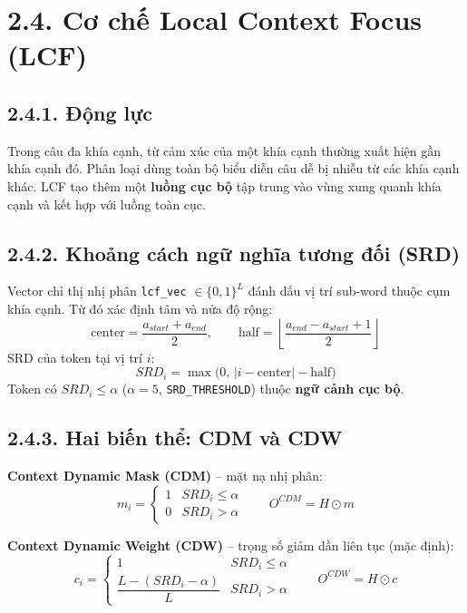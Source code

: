 \section{2.4.\; Cơ chế Local Context Focus (LCF)}
\label{sec:lcf}

\subsection{2.4.1.\; Động lực}

Trong câu đa khía cạnh, từ cảm xúc của một khía cạnh thường xuất hiện
gần khía cạnh đó. Phân loại dùng toàn bộ biểu diễn câu dễ bị nhiễu
từ các khía cạnh khác. LCF \cite{zeng2019lcf, yang2021lcfatepc} tạo
thêm một \textbf{luồng cục bộ} tập trung vào vùng xung quanh khía cạnh
và kết hợp với luồng toàn cục.

\subsection{2.4.2.\; Khoảng cách ngữ nghĩa tương đối (SRD)}
\label{subsec:srd}

Vector chỉ thị nhị phân \texttt{lcf\_vec} $\in\{0,1\}^{L}$ đánh dấu
vị trí sub-word thuộc cụm khía cạnh. Từ đó xác định tâm và nửa độ rộng:
\begin{equation}
\text{center} = \frac{a_{start}+a_{end}}{2},\qquad
\text{half} = \left\lfloor\frac{a_{end}-a_{start}+1}{2}\right\rfloor
\end{equation}
SRD của token tại vị trí $i$:
\begin{equation}
SRD_i = \max\!\Big(0,\,\big|i-\text{center}\big|-\text{half}\Big)
\label{eq:srd}
\end{equation}
Token có $SRD_i \le \alpha$ ($\alpha=5$, \texttt{SRD\_THRESHOLD}) thuộc
\textbf{ngữ cảnh cục bộ}.

\subsection{2.4.3.\; Hai biến thể: CDM và CDW}

\textbf{Context Dynamic Mask (CDM)} -- mặt nạ nhị phân:
\begin{equation}
m_i = \begin{cases} 1 & SRD_i \le \alpha\\ 0 & SRD_i > \alpha \end{cases}
\qquad O^{CDM} = H \odot m
\label{eq:cdm}
\end{equation}

\textbf{Context Dynamic Weight (CDW)} -- trọng số giảm dần liên tục (mặc định):
\begin{equation}
c_i = \begin{cases} 1 & SRD_i \le \alpha\\[4pt]
\dfrac{L-(SRD_i-\alpha)}{L} & SRD_i > \alpha \end{cases}
\qquad O^{CDW} = H \odot c
\label{eq:cdw}
\end{equation}

